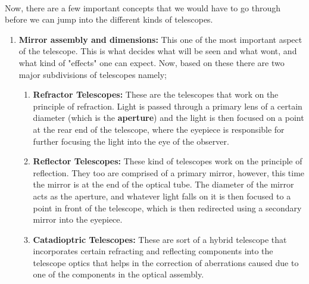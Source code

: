 \documentclass[a4paper,twoside]{article}
\numberwithin{equation}{section}
\begin{document}
\paragraph{}
Now, there are a few important concepts that we would have to go through before we can jump into the different kinds of telescopes. 
\begin{enumerate}
\item {\textbf{Mirror assembly and dimensions:} This one of the most important aspect of the telescope. This is what decides what will be seen and what wont, and what kind of "effects" one can expect. Now, based on these there are two major subdivisions of telescopes namely;
\begin{enumerate}
\item \textbf{Refractor Telescopes:} These are the telescopes that work on the principle of refraction. Light is passed through a primary lens of a certain diameter (which is the \textbf{aperture}) and the light is then focused on a point at the rear end of the telescope, where the eyepiece is responsible for further focusing the light into the eye of the observer. 
\item \textbf{Reflector Telescopes: } These kind of telescopes work on the principle of reflection. They too are comprised of a primary mirror, however, this time the mirror is at the end of the optical tube. The diameter of the mirror acts as the aperture, and whatever light falls on it is then focused to a point in front of the telescope, which is then redirected using a secondary mirror into the eyepiece.
\item \textbf{Catadioptric Telescopes: } These are sort of a hybrid telescope that incorporates certain refracting and reflecting components into the telescope optics that helps in the correction of aberrations caused due to one of the components in the optical assembly. 

\end{enumerate}}
\end{enumerate}
\end{document}
